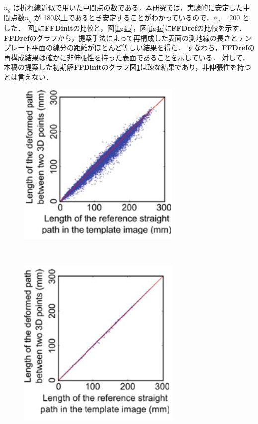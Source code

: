 \documentclass[10.5pt,twocolumn,a4j,fleqn]{ujarticle}
\def\figref#1{図\ref{#1}}
\begin{document}
$n_g$ は折れ線近似で用いた中間点の数である．本研究では，実験的に安定した中間点数$n_g$ が 180以上であるとき安定することがわかっているので，$n_g = 200$ とした．
\figref{fig4a}に{\bf FFDinit}の比較と，\figref{fig4b}，\figref{fig4c}に{\bf FFDref}の比較を示す．
{\bf FFDref}のグラフから，提案手法によって再構成した表面の測地線の長さとテンプレート平面の線分の距離がほとんど等しい結果を得た．
すなわち，{\bf FFDref}の再構成結果は確かに非伸張性を持った表面であることを示している．
対して，本稿の提案した初期解{\bf FFDinit}のグラフ\figref{fig4a}は疎な結果であり，非伸張性を持つとは言えない．
\begin{figure}[htbp]
    \centering
  \begin{minipage}[t]{\hsize}
    \centering
    \includegraphics[width=0.7\linewidth]{img/fig4a.png}
    \label{fig4a}
  \end{minipage}
    \\
  \begin{minipage}[t]{\hsize}
    \centering
    \includegraphics[width=0.7\linewidth]{img/fig4b.png}

\end{minipage}
\end{figure}
\end{document}
